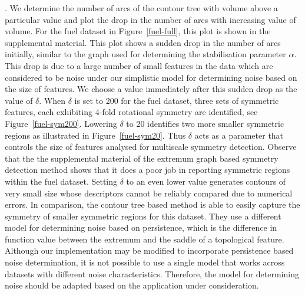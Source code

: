 \documentclass[review,journal]{vgtc}         %
\begin{document}
.
We determine the number of arcs of the contour tree with volume above a particular value and plot
the drop in the number of arcs with increasing value of volume. For the fuel dataset in 
Figure~\ref{fuel-full}, this plot is shown in the supplemental material. This plot shows a sudden
drop in the number of arcs initially, similar to the graph used for determining the stabilisation
parameter $\alpha$. This drop is due to a large number of small features in the data which are 
considered to be noise under our simplistic model for determining noise based on the size of features.
We choose a value immediately after this sudden drop as the value of $\delta$. When
$\delta$ is set to 200 for the fuel dataset, three sets of symmetric features, each exhibiting
4-fold rotational symmetry are identified, see Figure~\ref{fuel-sym200}. Lowering $\delta$ to 20
identifies two more smaller symmetric regions as illustrated in Figure~\ref{fuel-sym20}. Thus $\delta$
acts as a parameter that controls the size of features analysed for multiscale symmetry detection.
Observe that the the supplemental material of the extremum graph based symmetry detection method shows 
that it does a poor job in reporting symmetric regions within the fuel dataset. 
Setting $\delta$ to an even lower value generates contours of very small size whose descriptors 
cannot be reliably compared due to numerical errors. In comparison, the contour tree based 
method is able to easily capture the symmetry of smaller symmetric regions for this dataset. 
They use a different model for determining noise based on persistence, which is the difference in 
function value between the extremum and the saddle of a topological feature. 
Although our implementation may be modified to incorporate
persistence based noise determination, it is not possible to use a single model that works across
datasets with different noise characteristics. Therefore, the model for determining noise should
be adapted based on the application under consideration. 
\end{document}

